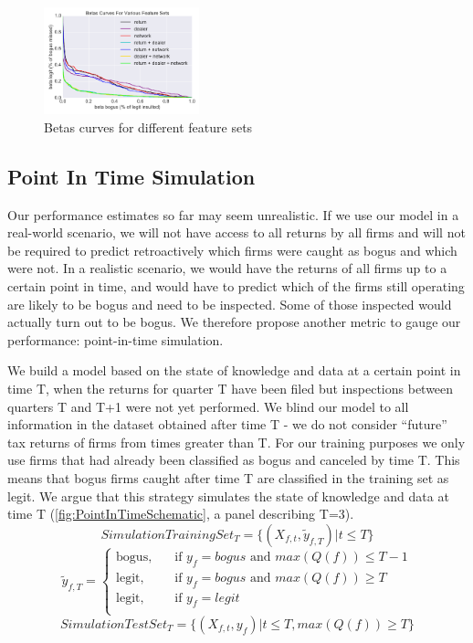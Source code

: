 \begin{figure}
  \includegraphics[width=0.4\textwidth]{graphs/PerformanceDifferentFeatureSets_v3.png}
  \caption{Betas curves for different feature sets}
  \label{fig:AllDataPerformanceDifferentFeatureSets}
\end{figure}

\subsection{Point In Time Simulation}
\label{subsec:PITSimulation}
Our performance estimates so far may seem unrealistic. If we use our model in a real-world scenario, we will not have access to all returns by all firms and will not be required to predict retroactively which firms were caught as bogus and which were not. In a realistic scenario, we would have the returns of all firms up to a certain point in time, and would have to predict which of the firms still operating are likely to be bogus and need to be inspected. Some of those inspected would actually turn out to be bogus. We therefore propose another metric to gauge our performance: point-in-time simulation. 

We build a model based on the state of knowledge and data at a certain point in time T, when the returns for quarter T have been filed but inspections between quarters T and T+1 were not yet performed. We blind our model to all information in the dataset obtained after time T - we do not consider ``future'' tax returns of firms from times greater than T. For our training purposes we only use firms that had already been classified as bogus and canceled by time T. This means that bogus firms caught after time T are classified in the training set as legit. We argue that this strategy simulates the state of knowledge and data at time T (\cref{fig:PointInTimeSchematic}, a panel describing T=3).
\[SimulationTrainingSet_T = \{(X_{f,t},\tilde{y}_{f,T}) | t\le T\}\]
\[   
\tilde{y}_{f,T} =
     \begin{cases}
       \text{bogus,} &\quad\text{if $y_f=bogus$ and $max(Q(f)) \le T-1$} \\
       \text{legit,} &\quad\text{if $y_f=bogus$ and $max(Q(f)) \ge T$} \\
       \text{legit,} &\quad\text{if $y_f=legit$} \\
     \end{cases}
\]
\[SimulationTestSet_T = \{(X_{f,t},y_f) | t\le T,max(Q(f)) \ge T\}\]


